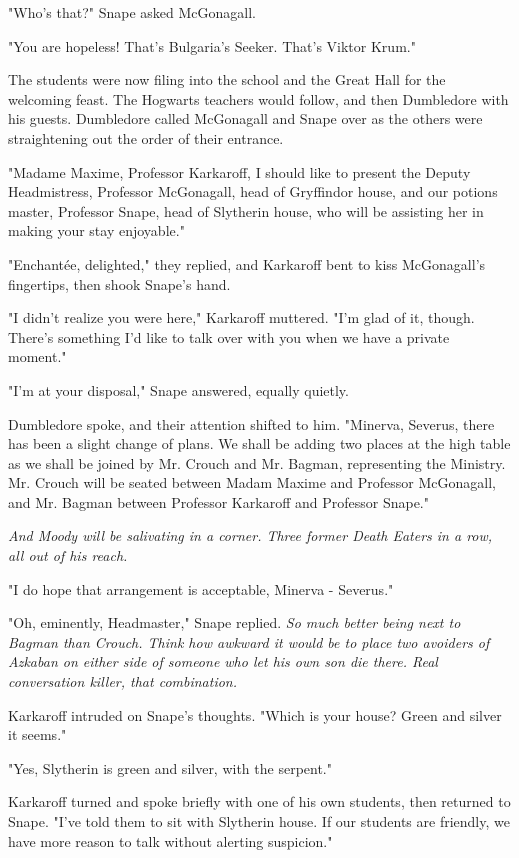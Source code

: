 "Who's that?" Snape asked McGonagall.

"You are hopeless! That's Bulgaria's Seeker. That's Viktor Krum."

The students were now filing into the school and the Great Hall for the welcoming feast. The Hogwarts teachers would follow, and then Dumbledore with his guests. Dumbledore called McGonagall and Snape over as the others were straightening out the order of their entrance.

"Madame Maxime, Professor Karkaroff, I should like to present the Deputy Headmistress, Professor McGonagall, head of Gryffindor house, and our potions master, Professor Snape, head of Slytherin house, who will be assisting her in making your stay enjoyable."

"Enchantée, delighted," they replied, and Karkaroff bent to kiss McGonagall's fingertips, then shook Snape's hand.

"I didn't realize you were here," Karkaroff muttered. "I'm glad of it, though. There's something I'd like to talk over with you when we have a private moment."

"I'm at your disposal," Snape answered, equally quietly.

Dumbledore spoke, and their attention shifted to him. "Minerva, Severus, there has been a slight change of plans. We shall be adding two places at the high table as we shall be joined by Mr. Crouch and Mr. Bagman, representing the Ministry. Mr. Crouch will be seated between Madam Maxime and Professor McGonagall, and Mr. Bagman between Professor Karkaroff and Professor Snape."

\emph{And Moody will be salivating in a corner. Three former Death Eaters in a row, all out of his reach.}

"I do hope that arrangement is acceptable, Minerva - Severus."

"Oh, eminently, Headmaster," Snape replied. \emph{So much better being next to Bagman than Crouch. Think how awkward it would be to place two avoiders of Azkaban on either side of someone who let his own son die there. Real conversation killer, that combination.}

Karkaroff intruded on Snape's thoughts. "Which is your house? Green and silver it seems."

"Yes, Slytherin is green and silver, with the serpent."

Karkaroff turned and spoke briefly with one of his own students, then returned to Snape. "I've told them to sit with Slytherin house. If our students are friendly, we have more reason to talk without alerting suspicion."

